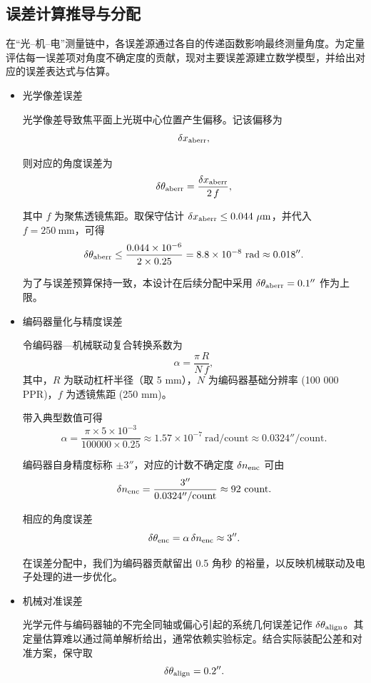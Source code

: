 \subsection{误差计算推导与分配}

在“光–机–电”测量链中，各误差源通过各自的传递函数影响最终测量角度。为定量评估每一误差项对角度不确定度的贡献，现对主要误差源建立数学模型，并给出对应的误差表达式与估算。

\begin{itemize}
	\item 光学像差误差
	
	光学像差导致焦平面上光斑中心位置产生偏移。记该偏移为
	$$
	\delta x_{\rm aberr},
	$$
	
	则对应的角度误差为
	$$
	\delta\theta_{\rm aberr}
	= \frac{\delta x_{\rm aberr}}{2\,f},
	$$
	
	其中 $f$ 为聚焦透镜焦距。取保守估计 $\delta x_{\rm aberr}\le 0.044~\mu\text{m}$，并代入 $f=250~\text{mm}$，可得
	$$
	\delta\theta_{\rm aberr}
	\le \frac{0.044\times 10^{-6}}{2\times 0.25}
	=8.8\times10^{-8}~\text{rad}
	\approx 0.018''.
	$$
	
	为了与误差预算保持一致，本设计在后续分配中采用 $\delta\theta_{\rm aberr}=0.1''$ 作为上限。
	
	\item 编码器量化与精度误差
	
	令编码器—机械联动复合转换系数为
	$$
	\alpha
	=\frac{\pi\,R}{N\,f},
	$$
	其中，$R$ 为联动杠杆半径（取 5 mm），$N$ 为编码器基础分辨率 (100 000 PPR)，$f$ 为透镜焦距 (250 mm)。
	
	带入典型数值可得
	$$
	\alpha
	=\frac{\pi\times5\times10^{-3}}{100000\times0.25}
	\approx1.57\times10^{-7}~\text{rad/count}
	\approx0.0324''/\text{count}.
	$$
	
	编码器自身精度标称 $\pm3''$，对应的计数不确定度 $\delta n_{\rm enc}$ 可由
	$$
	\delta n_{\rm enc}
	=\frac{3''}{0.0324''/\text{count}}
	\approx92~\text{count}.
	$$
	
	相应的角度误差
	$$
	\delta\theta_{\rm enc}
	=\alpha\,\delta n_{\rm enc}
	\approx3''.
	$$
	
	在误差分配中，我们为编码器贡献留出  0.5 角秒 的裕量，以反映机械联动及电子处理的进一步优化。
	
	\item 机械对准误差
	
	光学元件与编码器轴的不完全同轴或偏心引起的系统几何误差记作 $\delta\theta_{\rm align}$。其定量估算难以通过简单解析给出，通常依赖实验标定。结合实际装配公差和对准方案，保守取
	$$
	\delta\theta_{\rm align}=0.2''.
	$$
	

\end{itemize}
